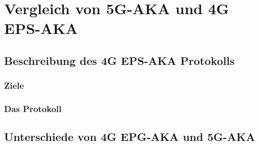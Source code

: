 \chapter{Vergleich von 5G-AKA und 4G EPS-AKA}
\label{chap:3}



\section{Beschreibung des 4G EPS-AKA Protokolls}

\subsection{Ziele}

\subsection{Das Protokoll}


\section{Unterschiede von 4G EPG-AKA und 5G-AKA}
